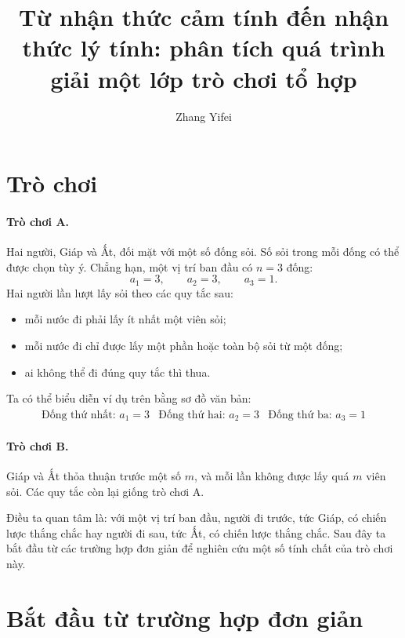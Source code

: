 \documentclass[11pt]{article}
\title{Từ nhận thức cảm tính đến nhận thức lý tính: phân tích quá trình giải một lớp trò chơi tổ hợp}
\author{Zhang Yifei}
\date{}
\begin{document}
\maketitle


\tableofcontents

\section{Trò chơi}

\paragraph{Trò chơi A.}
Hai người, Giáp và Ất, đối mặt với một số đống sỏi. Số sỏi trong mỗi đống có
thể được chọn tùy ý. Chẳng hạn, một vị trí ban đầu có \(n=3\) đống:
\[
  a_1=3,\qquad a_2=3,\qquad a_3=1.
\]
Hai người lần lượt lấy sỏi theo các quy tắc sau:
\begin{itemize}
  \item mỗi nước đi phải lấy ít nhất một viên sỏi;
  \item mỗi nước đi chỉ được lấy một phần hoặc toàn bộ sỏi từ một đống;
  \item ai không thể đi đúng quy tắc thì thua.
\end{itemize}
Ta có thể biểu diễn ví dụ trên bằng sơ đồ văn bản:
\[
\begin{array}{ccc}
\text{Đống thứ nhất: }a_1=3&
\text{Đống thứ hai: }a_2=3&
\text{Đống thứ ba: }a_3=1
\end{array}
\]

\paragraph{Trò chơi B.}
Giáp và Ất thỏa thuận trước một số \(m\), và mỗi lần không được lấy quá \(m\)
viên sỏi. Các quy tắc còn lại giống trò chơi A.

Điều ta quan tâm là: với một vị trí ban đầu, người đi trước, tức Giáp, có
chiến lược thắng chắc hay người đi sau, tức Ất, có chiến lược thắng chắc.
Sau đây ta bắt đầu từ các trường hợp đơn giản để nghiên cứu một số tính chất
của trò chơi này.

\section{Bắt đầu từ trường hợp đơn giản}
\end{document}
